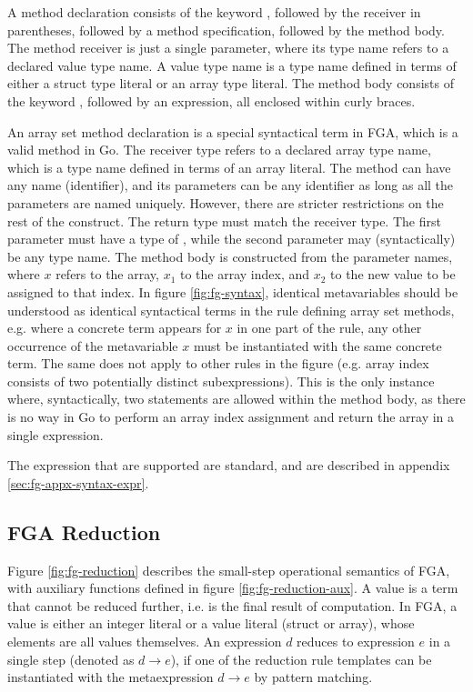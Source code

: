 A method declaration consists of the keyword \func, followed by the receiver in
parentheses, followed by a method specification, followed by the method body.
The method receiver is just a single parameter, where its type name refers to a
declared value type name. A value type name is a type name defined in terms of
either a struct type literal or an array type literal. The method body consists
of the keyword \return, followed by an expression, all enclosed within curly
braces.

An array set method declaration is a special syntactical term in FGA, which is a
valid method in Go. The receiver type refers to a declared array type name,
which is a type name defined in terms of an array literal. The method can have
any name (identifier), and its parameters can be any identifier as long as all
the parameters are named uniquely. However, there are stricter restrictions on
the rest of the construct. The return type must match the receiver type. The
first parameter must have a type of , while the second parameter may
(syntactically) be any type name. The method body is constructed from the
parameter names, where $x$ refers to the array, $x_1$ to the array index, and
$x_2$ to the new value to be assigned to that index. In figure
\ref{fig:fg-syntax}, identical metavariables should be understood as identical
syntactical terms in the rule defining array set methods, e.g. where a concrete
term appears for $x$ in one part of the rule, any other occurrence of the
metavariable $x$ must be instantiated with the same concrete term. The same does
not apply to other rules in the figure (e.g. array index consists of two
potentially distinct subexpressions). This is the only instance where,
syntactically, two statements are allowed within the method body, as there is no
way in Go to perform an array index assignment and return the array in a single
expression.

The expression that are supported are standard, and are described in
appendix \ref{sec:fg-appx-syntax-expr}.



\subsection{FGA Reduction}

Figure \ref{fig:fg-reduction} describes the small-step operational semantics of
FGA, with auxiliary functions defined in figure \ref{fig:fg-reduction-aux}. A
value is a term that cannot be reduced further, i.e. is the final result of
computation. In FGA, a value is either an integer literal or a value literal
(struct or array), whose elements are all values themselves. An expression $d$
reduces to expression $e$ in a single step (denoted as $d \to e$), if one of the
reduction rule templates can be instantiated with the metaexpression $d \to e$
by pattern matching.

